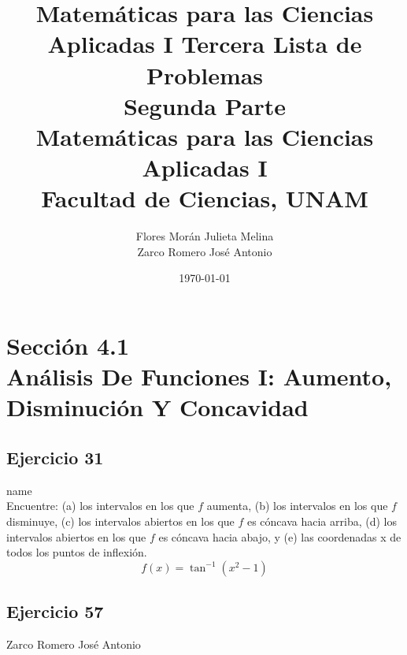 \documentclass[12pt]{article}
\title{Matemáticas para las Ciencias Aplicadas I}
\title{
	Tercera Lista de Problemas \\
	\textbf{Segunda  Parte} \\
	\vspace{1ex}
	\large Matemáticas para las Ciencias Aplicadas I \\
	Facultad de Ciencias, UNAM}
\date{\today}
\author{Flores Morán Julieta Melina \\ Zarco Romero José Antonio}
\begin{document}
\maketitle


\section{Sección 4.1 \\ Análisis De Funciones I: Aumento, Disminución Y Concavidad}
\subsection{Ejercicio 31} name \\

Encuentre: (a) los intervalos en los que $f$ aumenta, (b) los intervalos en los que $f$ disminuye, (c) los intervalos abiertos en los que $f$ es cóncava hacia arriba, (d) los intervalos abiertos en los que $f$ es cóncava hacia abajo, y (e) las coordenadas x de todos los puntos de inflexión.
\[
f(x) = \tan^{-1}(x^2-1)
\]

\subsection{Ejercicio 57} Zarco Romero José Antonio \\
\end{document}
